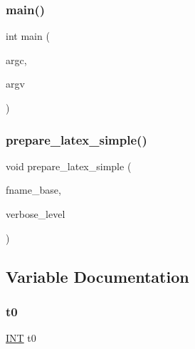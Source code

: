 \subsubsection{\texorpdfstring{main()}{main()}}
{\footnotesize\ttfamily int main (\begin{DoxyParamCaption}\item[{int}]{argc,  }\item[{char $\ast$$\ast$}]{argv }\end{DoxyParamCaption})}

\mbox{\label{field_8_c_a528dbc3668d6d9107524c9970d685d16}} 
\subsubsection{\texorpdfstring{prepare\+\_\+latex\+\_\+simple()}{prepare\_latex\_simple()}}
{\footnotesize\ttfamily void prepare\+\_\+latex\+\_\+simple (\begin{DoxyParamCaption}\item[{\mbox{\hyperlink{galois_8h_ab6cc7b4aeb6ea31aba2b3fbfc83ff5e6}{B\+Y\+TE}} $\ast$}]{fname\+\_\+base,  }\item[{\mbox{\hyperlink{galois_8h_a09fddde158a3a20bd2dcadb609de11dc}{I\+NT}}}]{verbose\+\_\+level }\end{DoxyParamCaption})}



\subsection{Variable Documentation}
\mbox{\label{field_8_c_a4268f4fe222ffb119218a0199f5e1904}} 
\subsubsection{\texorpdfstring{t0}{t0}}
{\footnotesize\ttfamily \mbox{\hyperlink{galois_8h_a09fddde158a3a20bd2dcadb609de11dc}{I\+NT}} t0}

